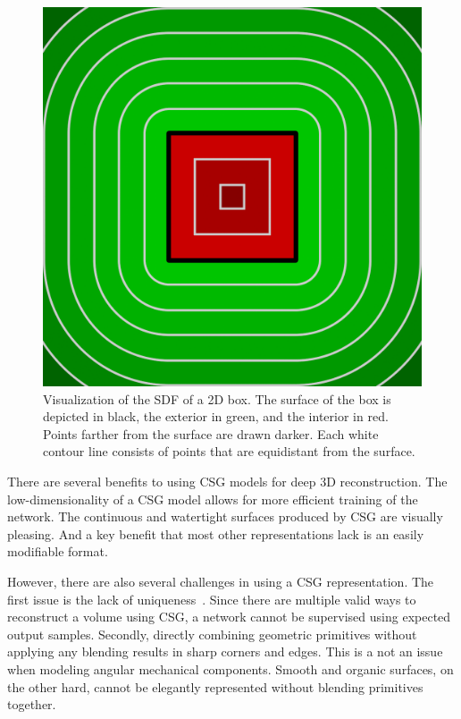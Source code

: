 \begin{figure}[!b]
	\centering
	\includegraphics[scale=0.2]{Images/SDF Box}
	\caption{Visualization of the SDF of a 2D box. The surface of the box is depicted in black, the exterior in green, and the interior in red. Points farther from the surface are drawn darker. Each white contour line consists of points that are equidistant from the surface.}
	\label{fig:sdf_box}
\end{figure}

There are several benefits to using CSG models for deep 3D reconstruction. The low-dimensionality of a CSG model allows for more efficient training of the network. The continuous and watertight surfaces produced by CSG are visually pleasing. And a key benefit that most other representations lack is an easily modifiable format.

\newpage

However, there are also several challenges in using a CSG representation. The first issue is the lack of uniqueness~\cite{Hughes2013}. Since there are multiple valid ways to reconstruct a volume using CSG, a network cannot be supervised using expected output samples. Secondly, directly combining geometric primitives without applying any blending results in sharp corners and edges. This is a not an issue when modeling angular mechanical components. Smooth and organic surfaces, on the other hard, cannot be elegantly represented without blending primitives together.

